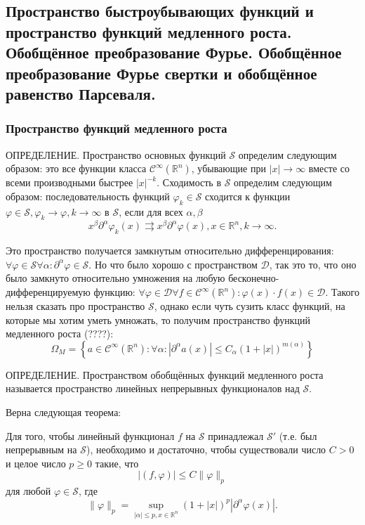 \subsection{Пространство быстроубывающих функций и пространство функций медленного роста.
Обобщённое преобразование Фурье. Обобщённое преобразование Фурье свертки и обобщённое равенство
Парсеваля.}
\label{question:30}

\subsubsection{Пространство функций медленного роста}

ОПРЕДЕЛЕНИЕ. Пространство основных функций $\mathcal{S}$ определим следующим образом: это все
функции класса $\mathcal{C}^\infty (\mathbb{R}^n)$, убывающие при $|x| \to \infty$ вместе со всеми
производными быстрее $|x|^{-k}$. Сходимость в $\mathcal{S}$ определим следующим образом:
последовательность функций $\varphi_k \in \mathcal{S}$ сходится к функции
$\varphi \in \mathcal{S}, \varphi_k \to \varphi, k \to \infty \text{ в } \mathcal{S}$, если для
всех $\alpha, \beta$
\[
  x^\beta \partial^\alpha \varphi_k (x) \rightrightarrows x^\beta \partial^\alpha \varphi(x), x\in\mathbb{R}^n, k \to \infty.
\]

Это пространство получается замкнутым относительно дифференцирования:
$\forall \varphi \in \mathcal{S} \forall \alpha : \partial^\alpha \varphi \in \mathcal{S}$.
Но что было хорошо с пространством $\mathcal{D}$, так это то, что оно было замкнуто относительно
умножения на любую бесконечно-дифференцируемую функцию:
$\forall \varphi \in \mathcal{D} \forall f \in \mathcal{C}^\infty (\mathbb{R}^n) : \varphi(x) \cdot f(x) \in \mathcal{D}$. Такого нельзя сказать про пространство $\mathcal{S}$, однако если чуть
сузить класс функций, на которые мы хотим уметь умножать, то получим пространство функций медленного
роста (????):
\[
  \Omega_M = \left\{ a\in\mathcal{C}^\infty(\mathbb{R}^n) :
    \forall\alpha : \left| \partial^\alpha a(x) \right|
      \leqslant C_\alpha (1+|x|)^{m(\alpha)} \right\} 
\]

ОПРЕДЕЛЕНИЕ. Пространством обобщённых функций медленного роста называется пространство линейных
непрерывных функционалов над $\mathcal{S}$.

Верна следующая теорема:
\begin{theorem}[Л. Шварц]
  Для того, чтобы линейный функционал $f$ на $\mathcal{S}$ принадлежал $\mathcal{S}'$ (т.е. был
  непрерывным на $\mathcal{S}$), необходимо и достаточно, чтобы существовали число $C>0$ и целое
  число $p\geqslant 0$ такие, что
  \[
    |(f, \varphi)| \leqslant C \|\varphi\|_p
  \]
  для любой $\varphi \in \mathcal{S}$, где
  \[
    \|\varphi\|_p = \sup_{|\alpha| \leqslant p, x\in\mathbb{R}^n} (1+|x|)^p |\partial^\alpha \varphi(x)|.
  \]
\end{theorem}

